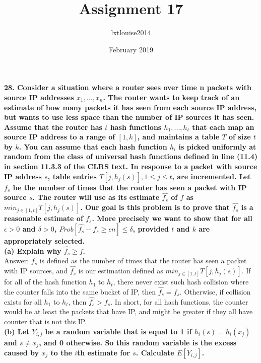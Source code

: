 \documentclass{article}
\title{Assignment 17}
\author{lxtlouise2014 }
\date{February 2019}
\begin{document}
\maketitle

\noindent
\textbf{28. Consider a situation where a router sees over time n packets with source IP addresses $x_1, ..., x_n$. The router wants to keep track of an estimate of how many packets it has seen from each source IP address, but wants to use less space than the number of IP sources it has seen. Assume that the router has $t$ hash functions $h_1, . . . , h_t$ that each map an source IP address to a range of $[1, k]$, and maintains a table $T$ of size $t$ by $k$. You can assume that each hash function $h_i$ is picked uniformly at random from the class of universal hash functions defined in line (11.4) in section 11.3.3 of the CLRS text. In response to a packet with source IP address $s$, table entries $T[j, h_j(s)], 1 \leq j \leq t$, are
incremented. Let $f_s$ be the number of times that the router has seen a packet with IP source $s$. The router will use as its estimate $\hat{f_{s}}$ of $f$ as $min_{j\in[1,t]}T[j, h_{j}(s)]$. Our goal is this problem is to prove that $\hat{f_{s}}$ is a reasonable estimate of $f_s$. More precisely we want to show that for all $\epsilon > 0$ and $\delta > 0$, $Prob[\hat{f_{s}} - f_{s} \geq \epsilon n] \leq \delta$, provided $t$ and $k$ are appropriately selected.} \\ \newline
\textbf{(a) Explain why $\hat{f_{s}} \geq f$.} \\ \newline
Answer: $f_s$ is defined as the number of times that the router has seen a packet with IP sources, and $\hat{f_{s}}$ is our estimation defined as $min_{j\in[1,t]}{T[j,h_j(s)]}$. If for all of the hash function $h_1$ to $h_t$, there never exist such hash collision where the counter falls into the same bucket of IP, then $\hat{f_{s}} = f_s$. Otherwise, if collision exists for all $h_1$ to $h_t$, then $\hat{f_{s}} > f_s$. In short, for all hash functions, the counter would be at least the packets that have IP, and might be greater if they all have counter that is not this IP.\\ \newline
\textbf{(b) Let $Y_{i, j}$ be a random variable that is equal to 1 if $h_i(s) = h_i(x_j)$ and $s \neq x_j$, and 0 otherwise. So this random variable is the excess caused by $x_j$ to the $i$th estimate for $s$. Calculate $E[Y_{i,j}]$.}\\ \newline
\end{document}
